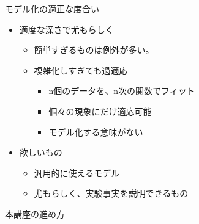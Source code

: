 \begin{frame}

\begin{block}{モデル化の適正な度合い}

\begin{itemize}

\item
  適度な深さで尤もらしく

  \begin{itemize}
  
  \item
    簡単すぎるものは例外が多い。
  \item
    複雑化しすぎても過適応

    \begin{itemize}
    
    \item
      n個のデータを、n次の関数でフィット\\
    \item
      個々の現象にだけ適応可能
    \item
      モデル化する意味がない
    \end{itemize}
  \end{itemize}
\item
  欲しいもの

  \begin{itemize}
  
  \item
    汎用的に使えるモデル
  \item
    尤もらしく、実験事実を説明できるもの
  \end{itemize}
\end{itemize}

\end{block}

\end{frame}

\begin{frame}

\begin{block}{本講座の進め方}

\end{block}

\end{frame}

